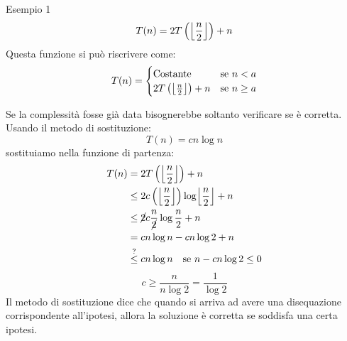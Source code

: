 \documentclass[a4paper]{article}
\begin{document}
\begin{examplebox}{Esempio 1}
  \[
    T(n) = 2T\left(\floor*{\frac{n}{2}}\right) + n
  \]
  Questa funzione si può riscrivere come:
  \[
  T(n) = \begin{cases}
    \text{Costante} & \text{se } n < a \\
    2T\left(\floor*{\frac{n}{2}}\right) + n & \text{se } n \ge a
  \end{cases}
  \]

  \vspace{1em}
  \noindent
  Se la complessità fosse già data bisognerebbe soltanto verificare se è corretta.
  Usando il metodo di sostituzione:
  \[
    T(n) = cn \log n
  \]
  sostituiamo nella funzione di partenza:
  \[
    \begin{aligned}
      T(n)  & = 2T\left(\floor*{\frac{n}{2}}\right) + n\\
            & \le 2c\left(\floor*{\frac{n}{2}}\right) \log \floor*{\frac{n}{2}} + n\\
            & \le \cancel{2} c \frac{n}{\cancel{2}} \log \frac{n}{2} + n\\
            & = cn \log n - cn \log 2 + n\\
            & \stackrel{?}{\le} cn \log n \quad \text{se } n- cn \log 2 \le 0\\
    \end{aligned}
  \]
  \[
    c \ge \frac{n}{n \log 2} = \frac{1}{\log 2}
  \]
  Il metodo di sostituzione dice che quando si arriva ad avere una disequazione
  corrispondente all'ipotesi, allora la soluzione è corretta se soddisfa una certa ipotesi.
\end{examplebox}
\end{document}

